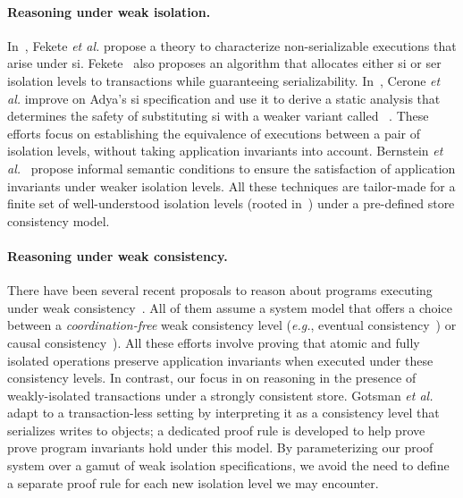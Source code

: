 \vspace*{-4pt}
\paragraph{Reasoning under weak isolation.} In~\cite{feketessi}, Fekete
\emph{et al.} propose a theory to characterize non-serializable
executions that arise under {\sc si}. Fekete~\cite{fekete2005} also
proposes an algorithm that allocates either {\sc si} or {\sc ser}
isolation levels to transactions while guaranteeing
serializability. In~\cite{gotsmanpodc16}, Cerone \emph{et al.} improve
on Adya's {\sc si} specification and use it to derive a static
analysis that determines the safety of substituting {\sc si} with a
weaker variant called ~\cite{psi}.
These efforts focus on establishing the equivalence of executions
between a pair of isolation levels, without taking application
invariants into account.  Bernstein \emph{et al.}~\cite{bern2000}
propose informal semantic conditions to ensure the satisfaction of
application invariants under weaker isolation levels.  All these
techniques are tailor-made for a finite set of well-understood
isolation levels (rooted in~\cite{berenson}) under a pre-defined store
consistency model.

\vspace*{-4pt}
\paragraph{Reasoning under weak consistency.} There have been several
recent proposals to reason about programs executing under weak
consistency~\cite{bailisvldb, alvarocalm, gotsmanpopl16,redblueatc,
redblueosdi, ecinec}. All of them assume a system model that offers a
choice between a \emph{coordination-free} weak consistency level
(\emph{e.g.}, eventual consistency~\cite{redblueosdi, redblueatc,
ecinec, alvarocalm, bailisvldb}) or causal
consistency~\cite{lbc16,gotsmanpopl16}). All these efforts involve
proving that atomic and fully isolated operations preserve application
invariants when executed under these consistency levels.  In contrast,
our focus in on reasoning in the presence of weakly-isolated
transactions under a strongly consistent store.  Gotsman \emph{et
al.}~\cite{gotsmanpopl16} adapt  to a
transaction-less setting by interpreting it as a consistency level
that serializes writes to objects; a dedicated proof rule is developed
to help prove prove program invariants hold under this model. By
parameterizing our proof system over a gamut of weak isolation
specifications, we avoid the need to define a separate proof rule for
each new isolation level we may encounter.

